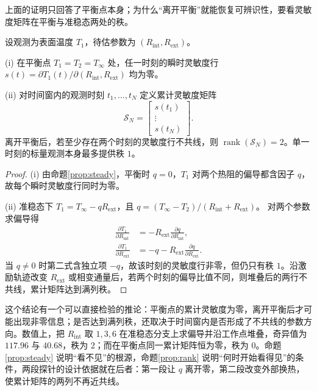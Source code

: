 上面的证明只回答了平衡点本身；为什么“离开平衡”就能恢复可辨识性，要看灵敏度矩阵在平衡与准稳态两处的秩。

\begin{proposition}
\label{prop:rank}
设观测为表面温度 \(T_1\)，待估参数为 \((R_{\mathrm{int}},R_{\mathrm{ext}})\)。

(i) 在平衡点 \(T_1=T_2=T_\infty\) 处，任一时刻的瞬时灵敏度行
\(s(t)=\partial T_1(t)/\partial(R_{\mathrm{int}},R_{\mathrm{ext}})\) 均为零。

(ii) 对时间窗内的观测时刻 \(t_1,\ldots,t_N\) 定义累计灵敏度矩阵
\[
\mathcal{S}_N=\begin{bmatrix}s(t_1)\\ \vdots\\ s(t_N)\end{bmatrix}.
\]
离开平衡后，若至少存在两个时刻的灵敏度行不共线，则
\(\operatorname{rank}(\mathcal{S}_N)=2\)。单一时刻的标量观测本身最多提供秩 \(1\)。
\end{proposition}

\begin{proof}
(i) 由命题\ref{prop:steady}，平衡时 \(q=0\)，\(T_1\) 对两个热阻的偏导都含因子 \(q\)，故每个瞬时灵敏度行同时为零。

(ii) 准稳态下 \(T_1=T_\infty-qR_{\mathrm{ext}}\)，且 \(q=(T_\infty-T_2)/(R_{\mathrm{int}}+R_{\mathrm{ext}})\)。
对两个参数求偏导得
\begin{equation}
\label{eq:partials}
\begin{aligned}
\frac{\partial T_1}{\partial R_{\mathrm{int}}}
&=-R_{\mathrm{ext}}\frac{\partial q}{\partial R_{\mathrm{int}}},\\
\frac{\partial T_1}{\partial R_{\mathrm{ext}}}
&=-q-R_{\mathrm{ext}}\frac{\partial q}{\partial R_{\mathrm{ext}}}.
\end{aligned}
\end{equation}
当 \(q\neq0\) 时第二式含独立项 \(-q\)，故该时刻的灵敏度行非零，但仍只有秩 \(1\)。沿激励轨迹改变 \(R_{\mathrm{ext}}\) 或相变通量后，若两个时刻的偏导比值不同，则堆叠后的两行不共线，累计矩阵达到满列秩。
\end{proof}

这个结论有一个可以直接检验的推论：平衡点的累计灵敏度为零，离开平衡后才可能出现非零信息；是否达到满列秩，还取决于时间窗内是否形成了不共线的参数方向。数值上，把 \(R_{\mathrm{int}}\) 取 \(1,3,6\) 在准稳态分支上求偏导并沿工作点堆叠，奇异值为 \(117.96\) 与 \(40.68\)，秩为 \(2\)；而在平衡点同一累计矩阵恒为零，秩为 \(0\)。命题\ref{prop:steady} 说明“看不见”的根源，命题\ref{prop:rank} 说明“何时开始看得见”的条件，两段探针的设计依据就在后者：第一段让 \(q\) 离开零，第二段改变外部换热，使累计矩阵的两列不再近共线。



